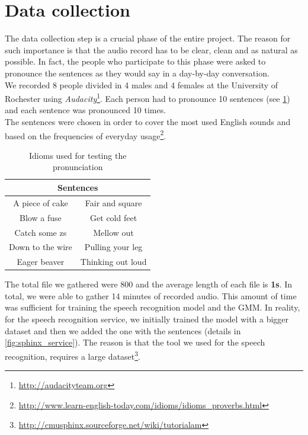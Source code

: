 \section{Data collection}
\label{sec:data_collection}

The data collection step is a crucial phase of the entire project. The reason for such importance is that the audio record has to be clear, clean and as natural as possible. In fact, the people who participate to this phase were asked to pronounce the sentences as they would say in a day-by-day conversation. \\

\noindent We recorded 8 people divided in 4 males and 4 females at the University of Rochester using \textit{Audacity}\footnote{\url{http://audacityteam.org}}. Each person had to pronounce 10 sentences (see \ref{table:sentences}) and each sentence was pronounced 10 times. \\
\noindent The sentences were chosen in order to cover the most used English sounds and based on the frequencies of everyday usage\footnote{\url{http://www.learn-english-today.com/idioms/idioms_proverbs.html}}.

\begin{table}[!ht]
	\centering
	\begin{tabular}{|c|c|}
		\hline
		\multicolumn{2}{|c|}{Sentences}      \\ \hline
		A piece of cake  & Fair and square   \\ \hline
		Blow a fuse      & Get cold feet     \\ \hline
		Catch some zs    & Mellow out        \\ \hline
		Down to the wire & Pulling your leg  \\ \hline
		Eager beaver     & Thinking out loud \\ \hline
	\end{tabular}
	\caption{Idioms used for testing the pronunciation}
	\label{table:sentences}
\end{table}

\noindent The total file we gathered were 800 and the average length of each file is \textbf{1s}. In total, we were able to gather 14 minutes of recorded audio. This amount of time was sufficient for training the speech recognition model and the GMM. In reality, for the speech recognition service, we initially trained the model with a bigger dataset and then we added the one with the sentences (details in \ref{fig:sphinx_service}). The reason is that the tool we used for the speech recognition, requires a large dataset\footnote{\url{http://cmusphinx.sourceforge.net/wiki/tutorialam}}.

